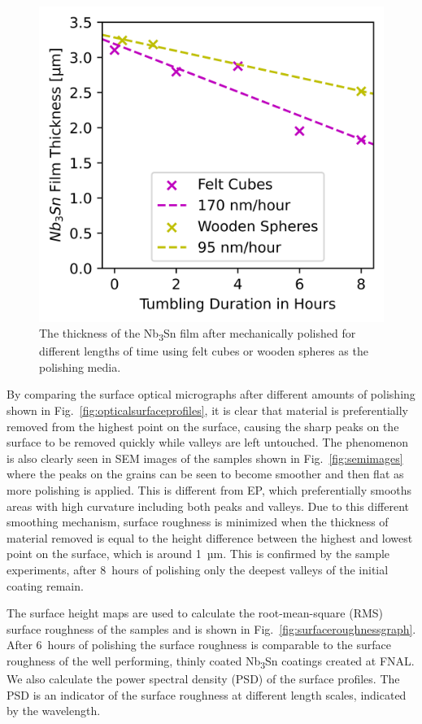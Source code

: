 \documentclass[reprint,amsmath,amssymb,aps]{revtex4-2}%
\begin{document}
%


\begin{figure}[t]%
\centering%
\includegraphics[width=0.8\columnwidth]{../doc/figs/Material_Removal_Graph.png}%
\caption{The thickness of the Nb\textsubscript{3}Sn film after mechanically polished for different lengths of time using felt cubes or wooden spheres as the polishing media.}%
\label{fig:materialremovalgraph}%
\end{figure}

By comparing the surface optical micrographs after different amounts of polishing shown in Fig.~\ref{fig:opticalsurfaceprofiles}, it is clear that material is preferentially removed from the highest point on the surface, causing the sharp peaks on the surface to be removed quickly while valleys are left untouched. The phenomenon is also clearly seen in SEM images of the samples shown in Fig.~\ref{fig:semimages} where the peaks on the grains can be seen to become smoother and then flat as more polishing is applied. This is different from EP, which preferentially smooths areas with high curvature including both peaks and valleys. Due to this different smoothing mechanism, surface roughness is minimized when the thickness of material removed is equal to the height difference between the highest and lowest point on the surface, which is around 1~µm. This is confirmed by the sample experiments, after 8~hours of polishing only the deepest valleys of the initial coating remain.

The surface height maps are used to calculate the root-mean-square (RMS) surface roughness of the samples and is shown in Fig.~\ref{fig:surfaceroughnessgraph}. After 6~hours of polishing the surface roughness is comparable to the surface roughness of the well performing, thinly coated Nb\textsubscript{3}Sn coatings created at FNAL\cite{posen2021advances}. We also calculate the power spectral density (PSD) of the surface profiles. The PSD is an indicator of the surface roughness at different length scales, indicated by the wavelength\cite{xu2011enhanced, pudasaini2017surface}.
\end{document}
